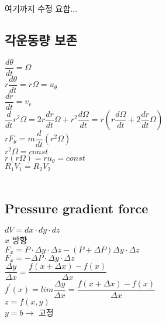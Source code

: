 여기까지 수정 요함...


\subsection{각운동량 보존}

$\dfrac{d \theta}{dt} = \Omega$ \\

$ r\dfrac{d \theta}{dt} = r \Omega = u_{\theta} $\\

$\dfrac{dr}{dt} = v_{r}$\\

$\dfrac{d}{dt} r^{2}\Omega = 2 r \dfrac{dr}{dt} \Omega + r^{2} \dfrac{d\Omega}{dt} 
= r \left( r \dfrac{d\Omega}{dt} +2 \dfrac{dr}{dt} \Omega \right) $\\

$ r F_{\theta} = m \dfrac{d}{dt} \left(r^{2} \Omega \right) $\\

$ r^{2} \Omega = const$\\

$ r \left( r \Omega \right) = r u_{\theta} = const $ \\


$ R_{1} V_{1} = R_{2} V_{2}$\\
\\


\subsection{Pressure gradient force}

$ dV = dx \cdot dy \cdot dz $\\

$x$ 방향 \\

$ F_{x} = P \cdot \Delta y \cdot \Delta z - \left( P + \Delta P \right) \Delta y \cdot \Delta z$\\

$ F_{x} = - \Delta P \cdot \Delta y \cdot \Delta z $\\

$ \dfrac { \Delta y}{\Delta x } = \dfrac {f\left(x + \Delta x \right) - f\left(x \right)}{ \Delta x}$\\

$f^{\prime} \left(x \right) = lim \dfrac { \Delta y}{\Delta x } 
= \dfrac {f\left(x + \Delta x \right) - f\left(x \right)}{ \Delta x}$\\

$z = f \left( x, y \right) $ \\
$y = b \rightarrow $ 고정 \\


